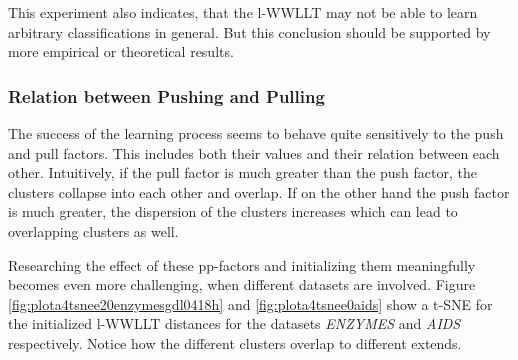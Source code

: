 		This experiment also indicates, that the l-WWLLT may not be able to learn arbitrary classifications in general.
		But this conclusion should be supported by more empirical or theoretical results.	

	\subsubsection{Relation between Pushing and Pulling} \label{subsubsec:exp_pp_factors}
		The success of the learning process seems to behave quite sensitively to the push and pull factors.
		This includes both their values and their relation between each other.
		Intuitively, if the pull factor is much greater than the push factor, the clusters collapse into each other and overlap.
		If on the other hand the push factor is much greater, the dispersion of the clusters increases which can lead to overlapping clusters as well.
		
		Researching the effect of these pp-factors and initializing them meaningfully becomes even more challenging, when different datasets are involved.
		Figure \ref{fig:plota4tsnee20enzymesgdl0418h} and \ref{fig:plota4tsnee0aids} show a t-SNE for the initialized l-WWLLT distances for the datasets \textit{ENZYMES} and \textit{AIDS} respectively.
		Notice how the different clusters overlap to different extends.
		
